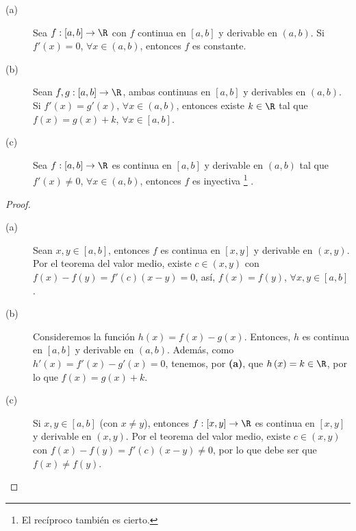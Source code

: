 \begin{fcolorary}[]
	\normalfont 
	\begin{description}
	\item[(a)] Sea $\displaystyle f: [a,b] \to \R $ con $\displaystyle f $ continua en $\displaystyle [a,b] $ y derivable en $\displaystyle \left(a,b\right) $. Si $\displaystyle f'\left(x\right) = 0 $, $\displaystyle \forall x \in \left(a,b\right) $, entonces $\displaystyle f $ es constante.
	\item[(b)] Sean $\displaystyle f,g : [a,b] \to \R $, ambas continuas en $\displaystyle [a,b] $ y derivables en $\displaystyle \left(a,b\right) $. Si $\displaystyle f'\left(x\right) = g'\left(x\right) $, $\displaystyle \forall x \in \left(a,b\right) $, entonces existe $\displaystyle k \in \R $ tal que $\displaystyle f\left(x\right) = g\left(x\right) + k $, $\displaystyle \forall x \in [a,b] $. 
	\item[(c)] Sea $\displaystyle f : [a,b] \to \R$ es continua en $\displaystyle \left[a,b\right]  $ y derivable en $\displaystyle \left(a,b\right) $ tal que $\displaystyle f'\left(x\right) \neq 0 $, $\displaystyle \forall x \in \left(a,b\right) $, entonces $\displaystyle f $ es inyectiva \footnote{El recíproco también es cierto.} .
	\end{description}
\end{fcolorary}
\begin{proof}
\begin{description}
	\item[(a)] Sean $\displaystyle x,y \in [a,b]$, entonces $\displaystyle f $ es continua en $\displaystyle [x,y] $  y derivable en $\displaystyle \left(x,y\right) $. Por el teorema del valor medio, existe $\displaystyle c \in \left(x,y\right) $ con $\displaystyle f\left(x\right)-f\left(y\right) = f'\left(c\right)\left(x-y\right) = 0 $, así, $\displaystyle f\left(x\right) = f\left(y\right) $, $\displaystyle \forall x,y \in \left[a,b\right]  $.
	\item[(b)] Consideremos la función $\displaystyle h\left(x\right) = f\left(x\right)-g\left(x\right) $. Entonces, $\displaystyle h $ es continua en $\displaystyle [a,b] $ y derivable en $\displaystyle \left(a,b\right) $. Además, como $\displaystyle h'\left(x\right) = f'\left(x\right)-g'\left(x\right) = 0 $, tenemos, por \textbf{(a)}, que $\displaystyle h\left(x\right) = k \in \R $, por lo que $\displaystyle f\left(x\right) = g\left(x\right) + k $.
	\item[(c)] Si $\displaystyle x,y \in [a,b] $ (con $\displaystyle x \neq y $), entonces $\displaystyle f : [x,y] \to \R $ es continua en $\displaystyle [x,y] $ y derivable en $\displaystyle \left(x,y\right) $. Por el teorema del valor medio, existe $\displaystyle c \in \left(x,y\right) $ con $\displaystyle f\left(x\right)-f\left(y\right) = f'\left(c\right)\left(x-y\right) \neq 0 $, por lo que debe ser que $\displaystyle f\left(x\right) \neq f\left(y\right) $.
\end{description}
\end{proof}

